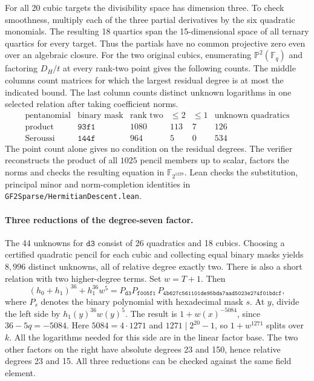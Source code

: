 \documentclass[11pt]{article}
\begin{document}
For all 20 cubic targets the divisibility space has dimension three.
To check smoothness, multiply each of the three partial derivatives
by the six quadratic monomials. The resulting 18 quartics span the
15-dimensional space of all ternary quartics for every target. Thus the
partials have no common projective zero even over an algebraic closure.
For the two original cubics, enumerating \(\mathbb P^2(\mathbb F_q)\)
and factoring \(D_H/t\) at every rank-two point gives the following counts. The middle columns
count matrices for which the largest residual degree is at most the
indicated bound. The last column counts distinct unknown logarithms
in one selected relation after taking coefficient norms.
\[
\begin{array}{l|c|r|r|r|r}
 \text{pentanomial}&\text{binary mask}&\text{rank two}&
     \le2&\le1&\text{unknown quadratics}\\\hline
 \text{product}&\mathtt{93f1}&1080&113&7&126\\
 \text{Seroussi}&\mathtt{144f}&964&5&0&534
\end{array}
\]
The point count alone gives no condition on the residual degrees.
The verifier reconstructs the product of all \(1025\) pencil members
up to scalar, factors the norms and checks the resulting equation in
\(\mathbb F_{2^{1229}}\). Lean checks the substitution, principal
minor and norm-completion identities in
\nolinkurl{GF2Sparse/HermitianDescent.lean}.

\paragraph{Three reductions of the degree-seven factor.}
The 44 unknowns for \(\mathtt{d3}\) consist of 26 quadratics and
18 cubics. Choosing a certified quadratic pencil for each cubic and
collecting equal binary masks yields \(8{,}996\) distinct unknowns,
all of relative degree exactly two. There is also a short relation
with two higher-degree terms. Set \(w=T+1\). Then
\[
 (h_0+h_1)^{36}+h_1^{36}w^5
  = P_{\mathtt{d3}} P_{\mathtt{f005f1}}\,
    P_{\mathtt{4b627c561101de95bda7aad5023e274f01bdcf}},
\]
where \(P_s\) denotes the binary polynomial with hexadecimal mask \(s\).
At \(y\), divide the left side by \(h_1(y)^{36}w(y)^5\). The result
is \(1+w(x)^{-5084}\), since \(36-5q=-5084\). Here
\(5084=4\cdot1271\) and \(1271\mid 2^{20}-1\), so
\(1+w^{1271}\) splits over \(k\). All the logarithms needed for this
side are in the linear factor base. The two other factors on the
right have absolute degrees 23 and 150, hence relative degrees 23
and 15. All three reductions can be checked against the same field element.
\end{document}
